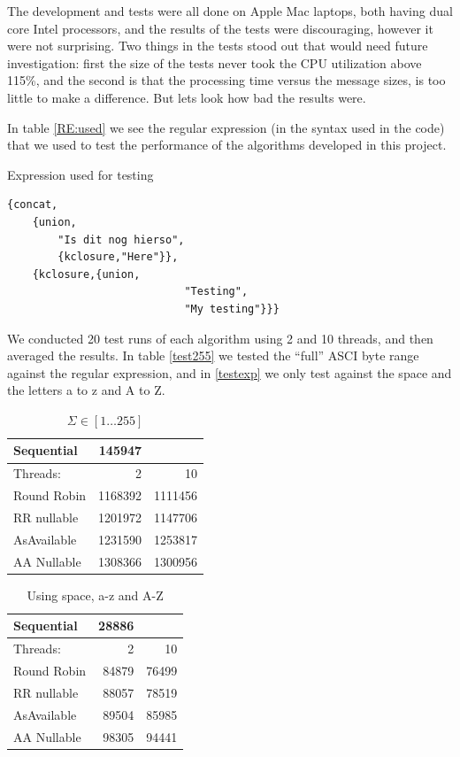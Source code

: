 \documentclass[a4paper,11pt]{report}
\begin{document}
The development and tests were all done on Apple Mac laptops, both
having dual core Intel processors, and the results of the tests were
discouraging, however it were not surprising. Two things in the tests
stood out that would need future investigation: first the size of the tests never
took the CPU utilization above 115\%, and the second is that the
processing time versus the message sizes, is too little to make a
difference. But lets look how bad the results were.

In table \autoref{RE:used} we see the regular expression (in the syntax
used in the code) that we used to test the performance of the
algorithms developed in this project. 

\begin{table}
\caption{Expression used for testing}
\label{RE:used}
\begin{verbatim} 
{concat,
	{union,
		"Is dit nog hierso",
		{kclosure,"Here"}},
	{kclosure,{union,
							"Testing",
							"My testing"}}}
\end{verbatim}
\end{table}

We conducted 20 test runs of each algorithm using 2 and 10 threads,
and then averaged the results.  In table \autoref{test255} we tested the
``full'' ASCI byte range against the regular expression, and in
\autoref{testexp} we only test against the space and the letters a to z
and A to Z.
 
\begin{table}
\caption{$\Sigma\in [1\ldots255]$}
\label{test255}
\begin{tabular}[h]{|l|r|r|}
	Sequential &145947&\\\hline
	Threads:&2&10\\\hline
	Round Robin &1168392 & 1111456 \\
	RR nullable &1201972 &1147706 \\
	AsAvailable & 1231590& 1253817\\
	AA Nullable & 1308366 &1300956 \\
\end{tabular}
\end{table}

\begin{table}
\label{testexp}
\caption{Using space, a-z and A-Z}

\begin{tabular}[h]{|l|r|r|}
	Sequential &28886&\\\hline
	Threads:&2&10\\\hline
	Round Robin &84879 & 76499 \\
	RR nullable &88057 &78519 \\
	AsAvailable & 89504& 85985\\
	AA Nullable & 98305 &94441 \\
\end{tabular}
\end{table}
\end{document}

